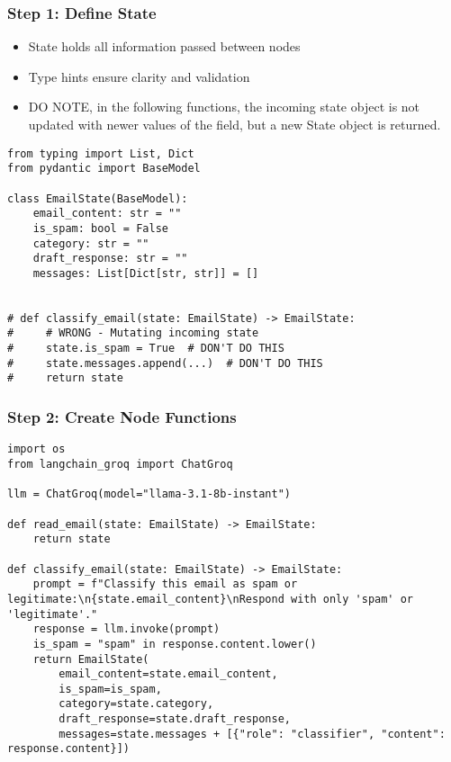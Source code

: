 \begin{frame}[fragile]\frametitle{Step 1: Define State}

      \begin{itemize}
        \item State holds all information passed between nodes
        \item Type hints ensure clarity and validation
		\item DO NOTE, in the following functions, the incoming state object is not updated with newer values of the field, but a new State object is returned.
      \end{itemize}
	  
	  
      \begin{lstlisting}
from typing import List, Dict
from pydantic import BaseModel

class EmailState(BaseModel):
    email_content: str = ""
    is_spam: bool = False
    category: str = ""
    draft_response: str = ""
    messages: List[Dict[str, str]] = []
	

# def classify_email(state: EmailState) -> EmailState:
#     # WRONG - Mutating incoming state
#     state.is_spam = True  # DON'T DO THIS
#     state.messages.append(...)  # DON'T DO THIS
#     return state
      \end{lstlisting}
      

\end{frame}

\begin{frame}[fragile]\frametitle{Step 2: Create Node Functions}
      \begin{lstlisting}
import os
from langchain_groq import ChatGroq

llm = ChatGroq(model="llama-3.1-8b-instant") 

def read_email(state: EmailState) -> EmailState:
    return state

def classify_email(state: EmailState) -> EmailState:
    prompt = f"Classify this email as spam or legitimate:\n{state.email_content}\nRespond with only 'spam' or 'legitimate'."
    response = llm.invoke(prompt)
    is_spam = "spam" in response.content.lower()
    return EmailState(
        email_content=state.email_content,
        is_spam=is_spam,
        category=state.category,
        draft_response=state.draft_response,
        messages=state.messages + [{"role": "classifier", "content": response.content}])

      \end{lstlisting}
\end{frame}


